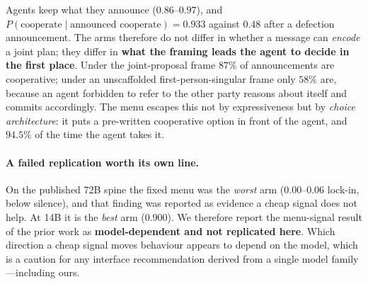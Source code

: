 Agents keep what they announce ($0.86$--$0.97$), and $P(\text{cooperate}\mid
\text{announced cooperate})=0.933$ against $0.48$ after a defection announcement. The
arms therefore do not differ in whether a message can \emph{encode} a joint plan; they
differ in \textbf{what the framing leads the agent to decide in the first place}. Under
the joint-proposal frame $87\%$ of announcements are cooperative; under an
unscaffolded first-person-singular frame only $58\%$ are, because an agent forbidden
to refer to the other party reasons about itself and commits accordingly. The menu
escapes this not by expressiveness but by \emph{choice architecture}: it puts a
pre-written cooperative option in front of the agent, and $94.5\%$ of the time the
agent takes it.

\paragraph{A failed replication worth its own line.}
On the published 72B spine the fixed menu was the \emph{worst} arm ($0.00$--$0.06$
lock-in, below silence), and that finding was reported as evidence a cheap signal does
not help. At 14B it is the \emph{best} arm ($0.900$). We therefore report the
menu-signal result of the prior work as \textbf{model-dependent and not replicated
here}. Which direction a cheap signal moves behaviour appears to depend on the model,
which is a caution for any interface recommendation derived from a single model
family---including ours.


